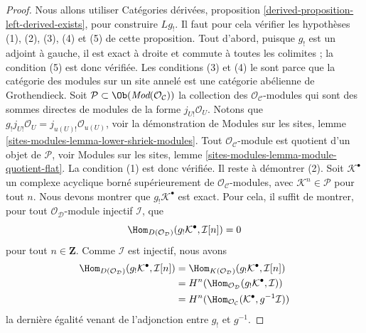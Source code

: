 \begin{proof}
Nous allons utiliser Catégories dérivées, proposition
\ref{derived-proposition-left-derived-exists}, pour construire $Lg_!$.
Il faut pour cela vérifier les hypothèses (1), (2), (3), (4) et (5) de cette
proposition. Tout d'abord, puisque $g_!$ est un adjoint à gauche, il est exact
à droite et commute à toutes les colimites ; la condition (5) est donc
vérifiée. Les conditions (3) et (4) le sont parce que la catégorie des modules
sur un site annelé est une catégorie abélienne de Grothendieck.
Soit $\mathcal{P} \subset \Ob(\textit{Mod}(\mathcal{O}_\mathcal{C}))$ la
collection des $\mathcal{O}_\mathcal{C}$-modules qui sont des sommes directes
de modules de la forme $j_{U!}\mathcal{O}_U$. Notons que
$g_!j_{U!}\mathcal{O}_U = j_{u(U)!} \mathcal{O}_{u(U)}$, voir la
démonstration de Modules sur les sites, lemme
\ref{sites-modules-lemma-lower-shriek-modules}. Tout
$\mathcal{O}_\mathcal{C}$-module est quotient d'un objet de $\mathcal{P}$,
voir Modules sur les sites, lemme
\ref{sites-modules-lemma-module-quotient-flat}. La condition (1) est donc
vérifiée. Il reste à démontrer (2).
Soit $\mathcal{K}^\bullet$ un complexe acyclique borné supérieurement de
$\mathcal{O}_\mathcal{C}$-modules, avec $\mathcal{K}^n \in \mathcal{P}$ pour
tout $n$. Nous devons montrer que $g_!\mathcal{K}^\bullet$ est exact. Pour
cela, il suffit de montrer, pour tout $\mathcal{O}_\mathcal{D}$-module
injectif $\mathcal{I}$, que
$$
\Hom_{D(\mathcal{O}_\mathcal{D})}(
g_!\mathcal{K}^\bullet, \mathcal{I}[n]) = 0
$$
pour tout $n \in \mathbf{Z}$. Comme $\mathcal{I}$ est injectif, nous avons
\begin{align*}
\Hom_{D(\mathcal{O}_\mathcal{D})}(
g_!\mathcal{K}^\bullet, \mathcal{I}[n])
& =
\Hom_{K(\mathcal{O}_\mathcal{D})}(
g_!\mathcal{K}^\bullet, \mathcal{I}[n]) \\
& =
H^n(\Hom_{\mathcal{O}_\mathcal{D}}(
g_!\mathcal{K}^\bullet, \mathcal{I})) \\
& =
H^n(\Hom_{\mathcal{O}_\mathcal{C}}(
\mathcal{K}^\bullet, g^{-1}\mathcal{I}))
\end{align*}
la dernière égalité venant de l'adjonction entre $g_!$ et $g^{-1}$.


\end{proof}
